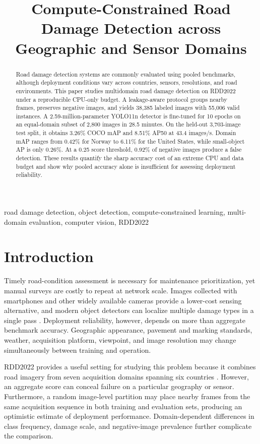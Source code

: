 \documentclass[conference]{ieee-template/vendor/IEEEtran/IEEEtran}
\title{Compute-Constrained Road Damage Detection across Geographic and Sensor Domains}
\author{\IEEEauthorblockN{Mateus Gomes de Ara\'{u}jo}
\IEEEauthorblockA{Computer Engineering\\
University of Bras\'{i}lia (UnB)\\
Bras\'{i}lia, Brazil\\
mathweuzz@gmail.com}}
\begin{document}
\maketitle

\begin{abstract}
Road damage detection systems are commonly evaluated using pooled benchmarks,
although deployment conditions vary across countries, sensors, resolutions,
and road environments. This paper studies multidomain road damage detection on
RDD2022 under a reproducible CPU-only budget. A leakage-aware protocol groups
nearby frames, preserves negative images, and yields 38,385 labeled images with
55,006 valid instances. A 2.59-million-parameter YOLO11n detector is fine-tuned
for 10 epochs on an equal-domain subset of 2,800 images in 28.5 minutes. On the
held-out 3,703-image test split, it obtains 3.26\% COCO mAP and 8.51\% AP50 at
43.4 images/s. Domain mAP ranges from 0.42\% for Norway to 6.11\% for the United
States, while small-object AP is only 0.26\%. At a 0.25 score threshold, 0.92\%
of negative images produce a false detection. These results quantify the sharp
accuracy cost of an extreme CPU and data budget and show why pooled accuracy
alone is insufficient for assessing deployment reliability.
\end{abstract}

\begin{IEEEkeywords}
road damage detection, object detection, compute-constrained learning,
multi-domain evaluation, computer vision, RDD2022
\end{IEEEkeywords}

\section{Introduction}
Timely road-condition assessment is necessary for maintenance prioritization,
yet manual surveys are costly to repeat at network scale. Images collected with
smartphones and other widely available cameras provide a lower-cost sensing
alternative, and modern object detectors can localize multiple damage types in
a single pass \cite{maeda2018road}. Deployment reliability, however, depends on
more than aggregate benchmark accuracy. Geographic appearance, pavement and
marking standards, weather, acquisition platform, viewpoint, and image
resolution may change simultaneously between training and operation.

RDD2022 provides a useful setting for studying this problem because it combines
road imagery from seven acquisition domains spanning six countries
\cite{arya2022rdd2022,arya2024rdd2022}. However, an aggregate score can conceal
failure on a particular geography or sensor. Furthermore, a random image-level
partition may place nearby frames from the same acquisition sequence in both
training and evaluation sets, producing an optimistic estimate of deployment
performance. Domain-dependent differences in class frequency, damage scale,
and negative-image prevalence further complicate the comparison.
\end{document}
